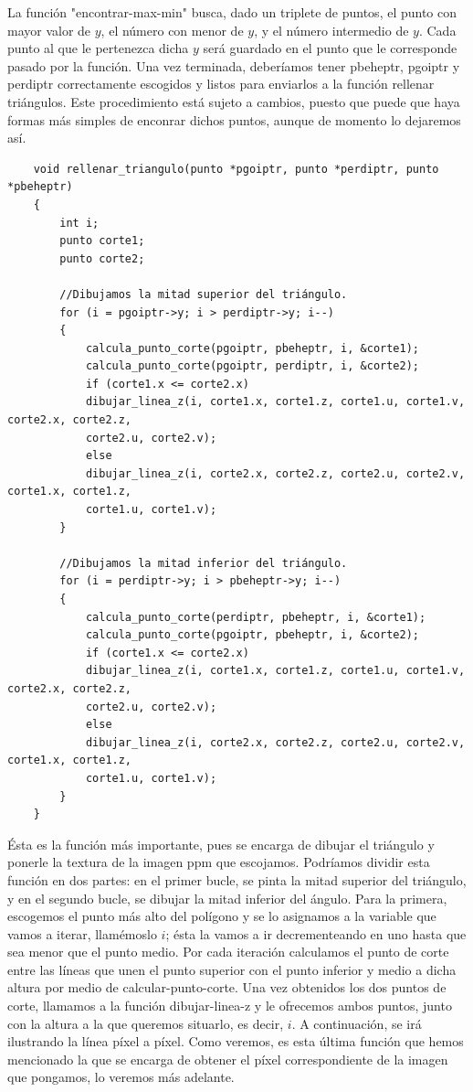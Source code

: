 \documentclass[12pt,a4paper]{article}
\begin{document}
La función "encontrar-max-min" busca, dado un triplete de puntos, el punto con mayor valor de $y$, el número con menor de $y$, y el número intermedio de $y$. Cada punto al que le pertenezca dicha $y$ será guardado en el punto que le corresponde pasado por la función. Una vez terminada, deberíamos tener pbeheptr, pgoiptr y perdiptr correctamente escogidos y listos para enviarlos a la función rellenar triángulos. Este procedimiento está sujeto a cambios, puesto que puede que haya formas más simples de enconrar dichos puntos, aunque de momento lo dejaremos así.
\begin{lstlisting}
	void rellenar_triangulo(punto *pgoiptr, punto *perdiptr, punto *pbeheptr)
	{
		int i;
		punto corte1;
		punto corte2;
		
		//Dibujamos la mitad superior del triángulo.
		for (i = pgoiptr->y; i > perdiptr->y; i--)
		{
			calcula_punto_corte(pgoiptr, pbeheptr, i, &corte1);
			calcula_punto_corte(pgoiptr, perdiptr, i, &corte2);
			if (corte1.x <= corte2.x)
			dibujar_linea_z(i, corte1.x, corte1.z, corte1.u, corte1.v, corte2.x, corte2.z, 
			corte2.u, corte2.v);
			else
			dibujar_linea_z(i, corte2.x, corte2.z, corte2.u, corte2.v, corte1.x, corte1.z, 
			corte1.u, corte1.v);
		}
		
		//Dibujamos la mitad inferior del triángulo.
		for (i = perdiptr->y; i > pbeheptr->y; i--)
		{
			calcula_punto_corte(perdiptr, pbeheptr, i, &corte1);
			calcula_punto_corte(pgoiptr, pbeheptr, i, &corte2);
			if (corte1.x <= corte2.x)
			dibujar_linea_z(i, corte1.x, corte1.z, corte1.u, corte1.v, corte2.x, corte2.z, 
			corte2.u, corte2.v);
			else
			dibujar_linea_z(i, corte2.x, corte2.z, corte2.u, corte2.v, corte1.x, corte1.z, 
			corte1.u, corte1.v);
		}
	}
\end{lstlisting}
Ésta es la función más importante, pues se encarga de dibujar el triángulo y ponerle la textura de la imagen ppm que escojamos. Podríamos dividir esta función en dos partes: en el primer bucle, se pinta la mitad superior del triángulo, y en el segundo bucle, se dibujar la mitad inferior del ángulo. Para la primera, escogemos el punto más alto del polígono y se lo asignamos a la variable que vamos a iterar, llamémoslo $i$; ésta la vamos a ir decrementeando en uno hasta que sea menor que el punto medio. Por cada iteración calculamos el punto de corte entre las líneas que unen el punto superior con el punto inferior y medio a dicha altura por medio de calcular-punto-corte. Una vez obtenidos los dos puntos de corte, llamamos a la función dibujar-linea-z y le ofrecemos ambos puntos, junto con la altura a la que queremos situarlo, es decir, $i$. A continuación, se irá ilustrando la línea píxel a píxel. Como veremos, es esta última función que hemos mencionado la que se encarga de obtener el píxel correspondiente de la imagen que pongamos, lo veremos más adelante.
\end{document}
